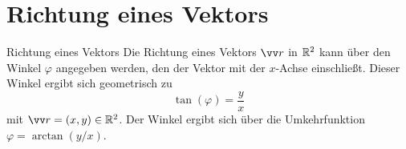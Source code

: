 \section{Richtung eines Vektors}\label{sec: Richtung_Vektor}
\begin{rememberbox}[]{Richtung eines Vektors}
    Die Richtung eines Vektors $\ivec{r}$ in $\mathbb{R}^2$ kann über den Winkel $\varphi$ angegeben werden, den der Vektor mit der $x$-Achse einschließt. Dieser Winkel ergibt sich geometrisch zu
    \begin{equation}
        \tan(\varphi) = \frac{y}{x}
    \end{equation}
    mit $\ivec{r} = (x, y) \in \Real^2$. Der Winkel ergibt sich über die Umkehrfunktion $\varphi = \arctan(y/x)$.
\end{rememberbox}

